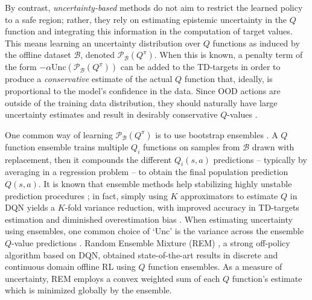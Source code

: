 By contrast, \textit{uncertainty-based} methods do not aim to
restrict the learned policy to a safe region; rather, they rely on
estimating epistemic uncertainty in the $Q$ function and integrating
this information in the computation of target values. This
means learning an uncertainty distribution over $Q$ functions as
induced by the offline dataset $\mathcal{B}$, denoted
$\mathcal{P}_{\mathcal{B}}\left(Q^\pi\right)$. When this is known, a
penalty term of the form
$-\alpha\textrm{Unc}\left(\mathcal{P}_{\mathcal{B}}\left(Q^\pi\right)\right)$
can be added to the TD-targets in order to produce a
\textit{conservative} estimate of the actual $Q$
function that, ideally, is proportional to the model's confidence in
the data.
Since OOD actions are outside of the training data distribution, they
should naturally have large uncertainty estimates and result in
desirably conservative $Q$-values \citep{levine2020offline}.

One common way of learning $\mathcal{P}_{\mathcal{B}}\left(Q^\pi\right)$ is to
use bootstrap ensembles
\citep{osband2016deep,kumar2019stabilizing,agarwal2020optimistic}.
A $Q$ function ensemble trains multiple $Q_i$ functions on samples from
$\mathcal{B}$ drawn with replacement, then it compounds the different
$Q_i\left(s,a\right)$ predictions -- typically by averaging in a
regression problem -- to obtain the final population prediction
$Q\left(s,a\right)$. It is known that ensemble methods help
stabilizing highly unstable prediction procedures
\citep{breiman1996bagging}; in fact, simply using $K$ approximators to
estimate $Q$ in DQN yields a $K$-fold variance reduction, with improved
accuracy in TD-targets estimation and diminished overestimation bias
\citep{anschel2017averaged}. When estimating uncertainty using
ensembles, one common choice of `Unc' is the variance across the
ensemble $Q$-value predictions \citep{kumar2019stabilizing}.
Random Ensemble Mixture (REM) \citep{agarwal2020optimistic}, a strong
off-policy algorithm based on DQN, obtained state-of-the-art results
in discrete and continuous domain offline RL using $Q$ function
ensembles. As a measure of uncertainty, REM employs a convex weighted
sum of each $Q$ function's estimate
which is minimized globally by the ensemble.
